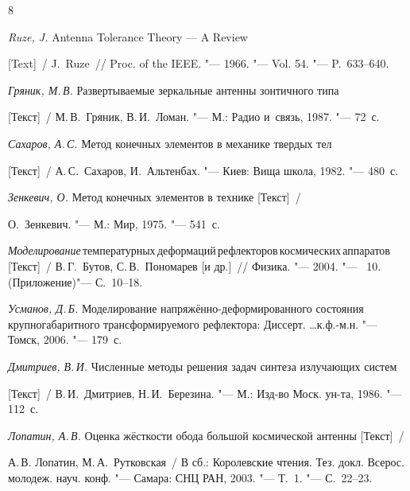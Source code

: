 \begin{thebibliography}{8}

\item \textit{Ruze, J.}  Antenna Tolerance Theory --- A Review

[Text]~/ J.~Ruze~/\!/ Proc. of the IEEE. "--- 1966. "--- Vol. 54. "--- P.~633--640.



\item \textit{Гряник, М.\,В.} Развертываемые зеркальные антенны зонтичного типа

[Текст]~/ М.\,В.~Гряник, В.\,И.~Ломан. "--- М.: Радио и~связь, 1987. "--- 72~с.



\item \textit{Сахаров, А.\,С.}  Метод конечных элементов в механике твердых тел

[Текст]~/ А.\,С.~Сахаров, И.~Альтенбах. "--- Киев: Вища школа, 1982. "--- 480~с.



\item \textit{Зенкевич, О.} Метод конечных элементов в технике [Текст]~/ 

О.~Зенкевич. "--- М.: Мир, 1975. "--- 541~с.



\item {\it Моделирование}\,температурных\,деформаций\,рефлекторов\,космических\,аппаратов\,[Текст]~/ В.\,Г.~Бутов, С.\,В.~Пономарев [и др.]~/\!/ Физика. "--- 2004. "--- \No~10. (Приложение)"--- С.~10--18.



\item \textit{Усманов, Д.\,Б.} Моделирование напряжённо-деформированного состояния крупногабаритного трансформируемого рефлектора:  Диссерт. \dots к.ф.-м.н. "--- Томск, 2006. "--- 179~с.



\item \textit{Дмитриев, В.\,И.} Численные методы решения задач синтеза излучающих систем

[Текст]~/ В.\,И.~Дмитриев, Н.\,И.~Березина. "--- М.: Изд-во Моск. ун-та, 1986. "--- 112~с.



\item \textit{Лопатин, А.\,В.} Оценка жёсткости обода большой космической антенны [Текст]~/

А.\,В. Лопатин, М.\,А.~Рутковская~/ В сб.: Королевские чтения. Тез. докл. Всерос. молодеж. науч. конф. "--- Самара: СНЦ РАН, 2003. "--- Т.~1. "--- С.~22--23.



\end{thebibliography}





\renewcommand{\baselinestretch}{0.9}

\makeengtitlem

\lfoot[]{}

\rfoot[]{}




%


